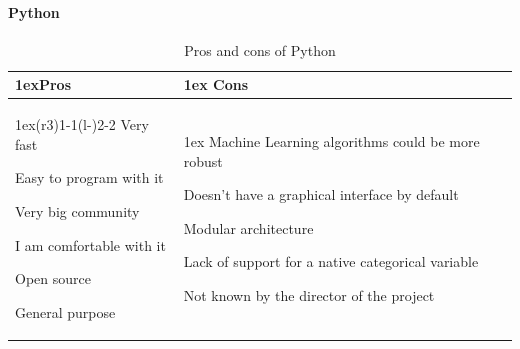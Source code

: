 \documentclass{article}
\begin{document}
        \paragraph{Python}
        \begin{table}[H]
        \begin{tabularx}{\linewidth}{>{\parskip1ex}X@{\kern4\tabcolsep}>{\parskip1ex}X}
        \toprule
        \hfil\bfseries Pros
        &
        \hfil\bfseries Cons
        \\\cmidrule(r{3\tabcolsep}){1-1}\cmidrule(l{-\tabcolsep}){2-2}
        Very fast\par
        Easy to program with it\par
        Very big community \par
        I am comfortable with it\par
        Open source \par
        General purpose \par
        &
        Machine Learning algorithms could be more robust\par
        Doesn't have a graphical interface by default\par
        Modular architecture\par
        Lack of support for a native categorical variable\par
        Not known by the director of the project\par
        \\\bottomrule
        \end{tabularx}
        \caption{Pros and cons of Python}
        \end{table}
\end{document}
